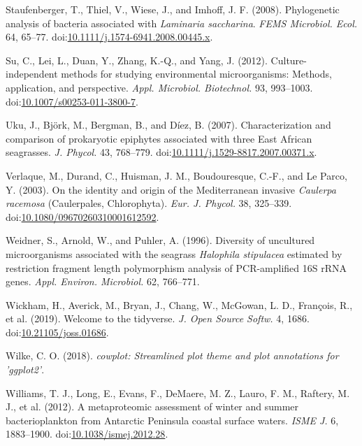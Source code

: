 \documentclass[12pt,]{article}
\begin{document}
\leavevmode\hypertarget{ref-Staufenberger2008}{}%
Staufenberger, T., Thiel, V., Wiese, J., and Imhoff, J. F. (2008).
Phylogenetic analysis of bacteria associated with \emph{Laminaria
saccharina}. \emph{FEMS Microbiol. Ecol.} 64, 65--77.
doi:\href{https://doi.org/10.1111/j.1574-6941.2008.00445.x}{10.1111/j.1574-6941.2008.00445.x}.

\leavevmode\hypertarget{ref-Su2012}{}%
Su, C., Lei, L., Duan, Y., Zhang, K.-Q., and Yang, J. (2012).
Culture-independent methods for studying environmental microorganisms:
Methods, application, and perspective. \emph{Appl. Microbiol.
Biotechnol.} 93, 993--1003.
doi:\href{https://doi.org/10.1007/s00253-011-3800-7}{10.1007/s00253-011-3800-7}.

\leavevmode\hypertarget{ref-Uku2007}{}%
Uku, J., Björk, M., Bergman, B., and Díez, B. (2007). Characterization
and comparison of prokaryotic epiphytes associated with three East
African seagrasses. \emph{J. Phycol.} 43, 768--779.
doi:\href{https://doi.org/10.1111/j.1529-8817.2007.00371.x}{10.1111/j.1529-8817.2007.00371.x}.

\leavevmode\hypertarget{ref-Verlaque2003}{}%
Verlaque, M., Durand, C., Huisman, J. M., Boudouresque, C.-F., and Le
Parco, Y. (2003). On the identity and origin of the Mediterranean
invasive \emph{Caulerpa racemosa} (Caulerpales, Chlorophyta). \emph{Eur.
J. Phycol.} 38, 325--339.
doi:\href{https://doi.org/10.1080/09670260310001612592}{10.1080/09670260310001612592}.

\leavevmode\hypertarget{ref-Weidner1996}{}%
Weidner, S., Arnold, W., and Puhler, A. (1996). Diversity of uncultured
microorganisms associated with the seagrass \emph{Halophila stipulacea}
estimated by restriction fragment length polymorphism analysis of
PCR-amplified 16S rRNA genes. \emph{Appl. Environ. Microbiol.} 62,
766--771.

\leavevmode\hypertarget{ref-Wickham2019}{}%
Wickham, H., Averick, M., Bryan, J., Chang, W., McGowan, L. D.,
François, R., et al. (2019). Welcome to the tidyverse. \emph{J. Open
Source Softw.} 4, 1686.
doi:\href{https://doi.org/10.21105/joss.01686}{10.21105/joss.01686}.

\leavevmode\hypertarget{ref-Wilke2018}{}%
Wilke, C. O. (2018). \emph{cowplot: Streamlined plot theme and plot
annotations for 'ggplot2'}.

\leavevmode\hypertarget{ref-Williams2012}{}%
Williams, T. J., Long, E., Evans, F., DeMaere, M. Z., Lauro, F. M.,
Raftery, M. J., et al. (2012). A metaproteomic assessment of winter and
summer bacterioplankton from Antarctic Peninsula coastal surface waters.
\emph{ISME J.} 6, 1883--1900.
doi:\href{https://doi.org/10.1038/ismej.2012.28}{10.1038/ismej.2012.28}.
\end{document}
